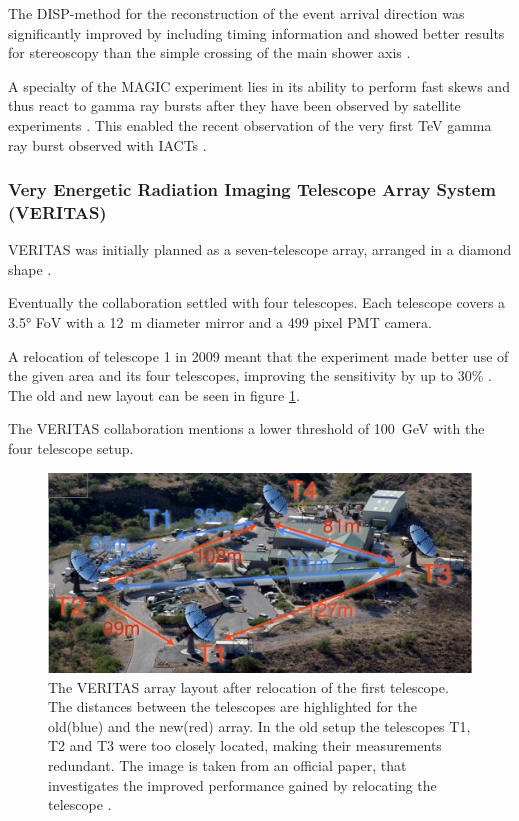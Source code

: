 The DISP-method for the reconstruction of the event arrival direction 
was significantly improved by including timing information and showed better 
results for stereoscopy than the simple crossing of the main shower axis \cite{ALEKSIC2012435}.

A specialty of the MAGIC experiment lies in its ability to 
perform fast skews and thus react to gamma ray bursts after they have been observed 
by satellite experiments \cite{2003ICRC....5.2943B}.
This enabled the recent observation of the very first \si{\TeV}
gamma ray burst observed with IACTs \cite{collaboration2019teraelectronvolt}.


\subsubsection{Very Energetic Radiation Imaging Telescope Array System (VERITAS)}
VERITAS	was initially planned as a seven-telescope array, arranged in a diamond shape
\cite{WEEKES2002221}.

Eventually the collaboration settled 
with four telescopes. 
Each telescope covers a 3.5° FoV with a \SI{12}{\meter} diameter mirror and 
a 499 pixel PMT camera.

A relocation of telescope 1 in 2009 meant that the 
experiment made better use of the given area and its four telescopes,
improving the sensitivity by up to 30\% \cite{2009arXiv0912.3841P}.
The old and new layout can be seen in figure \ref{fig:veritas_relocation}.

The VERITAS collaboration mentions a lower threshold of \SI{100}{\giga\electronvolt}
with the four telescope setup.

\begin{figure}
	\center
	\captionsetup{width=0.9\linewidth}
	\includegraphics[width=.9\textwidth]{images/veritas_relocation.png}
	\caption{The VERITAS array layout after relocation of the first 
		telescope. The distances between the telescopes are 
		highlighted for the old(blue) and the new(red) array.
		In the old setup the telescopes T1, T2 and T3 were too closely
		located, making their measurements redundant.
	 	The image is taken from an official paper, that investigates
		the improved performance gained by relocating the telescope \cite{2009arXiv0912.3841P}.}
	\label{fig:veritas_relocation}
\end{figure}

